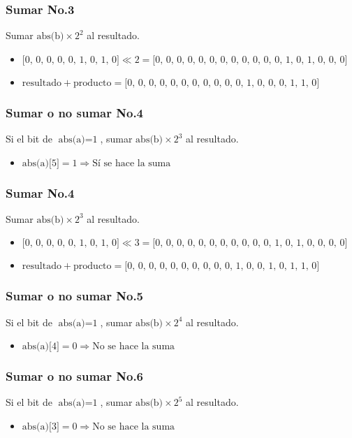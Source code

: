 \documentclass{beamer}
\begin{document}
\begin{frame}
\frametitle{Sumar No.3}
Sumar $\text{abs(b)}\times\text{2}^{\text{2}}$ al resultado.
\begin{itemize}
\item $\text{[0, 0, 0, 0, 0, 1, 0, 1, 0]}\ll\text{2}=\text{[0, 0, 0, 0, 0, 0, 0, 0, 0, 0, 0, 0, 1, 0, 1, 0, 0, 0]}$
\item $\text{resultado}+\text{producto}=\text{[0, 0, 0, 0, 0, 0, 0, 0, 0, 0, 0, 1, 0, 0, 0, 1, 1, 0]}$
\end{itemize}
\end{frame}
\begin{frame}
\frametitle{Sumar o no sumar No.4}
Si el bit de $\text{abs(a)}=\text{1}$, sumar $\text{abs(b)}\times\text{2}^{\text{3}}$ al resultado.
\begin{itemize}
\item $\text{abs(a)[5]}=\text{1}\Longrightarrow\text{Sí se hace la suma}$
\end{itemize}
\end{frame}
\begin{frame}
\frametitle{Sumar No.4}
Sumar $\text{abs(b)}\times\text{2}^{\text{3}}$ al resultado.
\begin{itemize}
\item $\text{[0, 0, 0, 0, 0, 1, 0, 1, 0]}\ll\text{3}=\text{[0, 0, 0, 0, 0, 0, 0, 0, 0, 0, 0, 1, 0, 1, 0, 0, 0, 0]}$
\item $\text{resultado}+\text{producto}=\text{[0, 0, 0, 0, 0, 0, 0, 0, 0, 0, 1, 0, 0, 1, 0, 1, 1, 0]}$
\end{itemize}
\end{frame}
\begin{frame}
\frametitle{Sumar o no sumar No.5}
Si el bit de $\text{abs(a)}=\text{1}$, sumar $\text{abs(b)}\times\text{2}^{\text{4}}$ al resultado.
\begin{itemize}
\item $\text{abs(a)[4]}=\text{0}\Longrightarrow\text{No se hace la suma}$
\end{itemize}
\end{frame}
\begin{frame}
\frametitle{Sumar o no sumar No.6}
Si el bit de $\text{abs(a)}=\text{1}$, sumar $\text{abs(b)}\times\text{2}^{\text{5}}$ al resultado.
\begin{itemize}
\item $\text{abs(a)[3]}=\text{0}\Longrightarrow\text{No se hace la suma}$
\end{itemize}
\end{frame}
\end{document}
